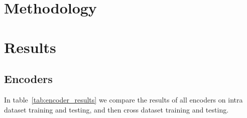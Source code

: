 \documentclass[sigconf, nonacm]{acmart}
\begin{document}
\section{Methodology}

\section{Results}

\subsection{Encoders}

In table~\ref{tab:encoder_results} we compare the results of all encoders on intra dataset training and testing, and then cross dataset training and testing. 

\end{document}
